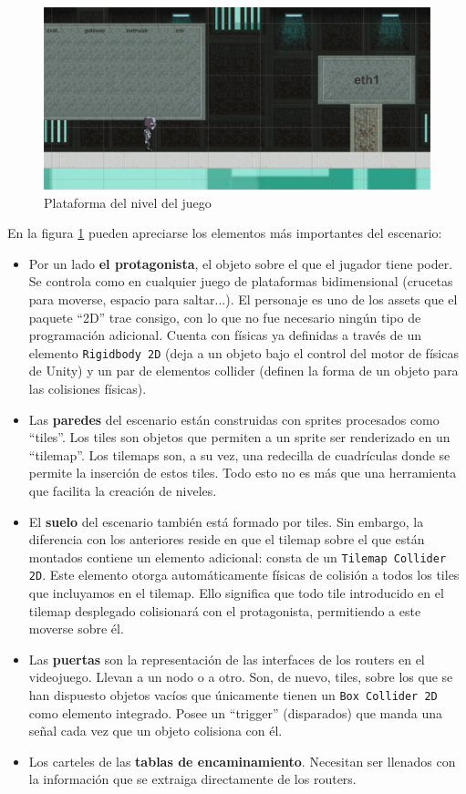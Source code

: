 \begin{figure}[h]
  \centering
  \includegraphics[scale=0.175]{imagenes/monieco}
  \caption{Plataforma del nivel del juego}
  \label{fig:monieco}
\end{figure}

En la figura \ref{fig:monieco} pueden apreciarse los elementos más importantes del escenario:

\begin{itemize}
\item Por un lado \textbf{el protagonista}, el objeto sobre el que el jugador tiene poder. Se controla como en cualquier juego de plataformas bidimensional (crucetas para moverse, espacio para saltar...). El personaje es uno de los assets que el paquete ``2D'' trae consigo, con lo que no fue necesario ningún tipo de programación adicional. Cuenta con físicas ya definidas a través de un elemento \texttt{Rigidbody 2D} (deja a un objeto bajo el control del motor de físicas de Unity\cite{rigidbody}) y un par de elementos collider (definen la forma de un objeto para las colisiones físicas\cite{colliders}).
\item Las \textbf{paredes} del escenario están construidas con sprites procesados como ``tiles''. Los tiles son objetos que permiten a un sprite ser renderizado en un ``tilemap''\cite{tiles}. Los tilemaps son, a su vez, una redecilla de cuadrículas donde se permite la inserción de estos tiles. Todo esto no es más que una herramienta que facilita la creación de niveles. 
\item El \textbf{suelo} del escenario también está formado por tiles. Sin embargo, la diferencia con los anteriores reside en que el tilemap sobre el que están montados contiene un elemento adicional: consta de un \texttt{Tilemap Collider 2D}. Este elemento otorga automáticamente físicas de colisión a todos los tiles que incluyamos en el tilemap. Ello significa que todo tile introducido en el tilemap desplegado colisionará con el protagonista, permitiendo a este moverse sobre él.
\item Las \textbf{puertas} son la representación de las interfaces de los routers en el videojuego. Llevan a un nodo o a otro. Son, de nuevo, tiles, sobre los que se han dispuesto objetos vacíos que únicamente tienen un \texttt{Box Collider 2D} como elemento integrado. Posee un ``trigger'' (disparados) que manda una señal cada vez que un objeto colisiona con él.
\item Los carteles de las \textbf{tablas de encaminamiento}. Necesitan ser llenados con la información que se extraiga directamente de los routers.
\end{itemize}

